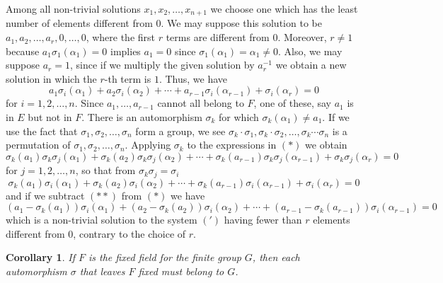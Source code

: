 \documentclass[10pt,leqno]{article}
\newtheorem{coro}{Corollary}
\theoremstyle{definition}
\begin{document}
Among all non-trivial solutions $x_1, x_2, \ldots, x_{n+1}$ we choose one which has the least number of elements different from $0$.
We may suppose this solution to be $a_1, a_2, \ldots, a_r, 0, \ldots, 0$, where the first $r$ terms are different from $0$.
Moreover, $r\not=1$ because $a_1 \sigma_1(\alpha_1) = 0$ implies $a_1 = 0$ since $\sigma_1(\alpha_1) = \alpha_1 \not= 0$.
Also, we may suppose $a_r = 1$, since if we multiply the given solution by $a_r^{-1}$ we obtain a new solution in which the $r$-th term is $1$.
Thus, we have
\begin{equation}
\tag{$*$}
a_1 \sigma_{i}(\alpha_1) + 
a_2 \sigma_{i}(\alpha_2) + 
\cdots +
a_{r-1} \sigma_{i}(\alpha_{r-1}) +
\sigma_{i}(\alpha_{r}) = 0
\end{equation}
for $i = 1,2,\ldots,n$.
Since $a_1, \ldots, a_{r-1}$ cannot all belong to $F$, one of these, say $a_1$ is in $E$ but not in $F$.
There is an automorphism $\sigma_k$ for which $\sigma_k(\alpha_1) \not= a_1$.
If we use the fact that $\sigma_1, \sigma_2, \ldots, \sigma_n$ form a group, we see $\sigma_k \cdot \sigma_1, \sigma_k \cdot \sigma_2, \ldots, \sigma_k \cdots \sigma_n$ is a permutation of $\sigma_1, \sigma_2, \ldots, \sigma_n$.
Applying $\sigma_k$ to the expressions in $(*)$ we obtain
\begin{equation*}
\sigma_k(a_1) \sigma_k \sigma_{j}(\alpha_1) + 
\sigma_k(a_2) \sigma_k \sigma_{j}(\alpha_2) + 
\cdots +
\sigma_k(a_{r-1}) \sigma_k \sigma_{j}(\alpha_{r-1}) +
\sigma_k \sigma_{j}(\alpha_{r}) = 0
\end{equation*}
for $j=1,2,\ldots,n$, so that from $\sigma_k \sigma_j = \sigma_i$
\begin{equation}
\tag{$**$}
\sigma_k(a_1) \sigma_{i}(\alpha_1) + 
\sigma_k(a_2) \sigma_{i}(\alpha_2) + 
\cdots +
\sigma_k(a_{r-1}) \sigma_{i}(\alpha_{r-1}) +
\sigma_{i}(\alpha_{r}) = 0
\end{equation}
and if we subtract $(**)$ from $(*)$ we have
\begin{equation*}
(a_1 - \sigma_k(a_1)) \sigma_{i}(\alpha_1) + 
(a_2 - \sigma_k(a_2)) \sigma_{i}(\alpha_2) + 
\cdots +
(a_{r-1} - \sigma_k(a_{r-1})) \sigma_{i}(\alpha_{r-1}) = 0
\end{equation*}
which is a non-trivial solution to the system $(')$ having fewer than $r$ elements different from $0$, contrary to the choice of $r$.


\begin{coro}
\label{coro:on}
If $F$ is the fixed field for the finite group $G$, then each automorphism $\sigma$ that leaves $F$ fixed must belong to $G$.
\end{coro}
\end{document}
